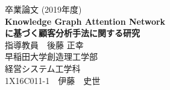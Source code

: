 \thispagestyle{empty}
\begin{center}
\vspace*{0mm}\hspace*{-0cm}
{\large 卒業論文 (2019年度)}\\
\vspace*{15mm}\hspace*{-0cm}
{\LARGE\bf Knowledge Graph Attention Network }\\
\vspace*{5mm}\hspace*{-0cm}
{\LARGE\bf に基づく顧客分析手法に関する研究}\\
\vspace*{60mm}\hspace*{-0cm}
{\Large 指導教員　後藤 正幸}\\
\vspace*{30mm}\hspace*{-0cm}
{\large 早稲田大学創造理工学部}\\
\vspace*{1mm}\hspace*{-0cm}
{\large 経営システム工学科}\\
\vspace*{10mm}\hspace*{-0cm}
{\Large 1X16C011-1　伊藤　史世}\\
\end{center}


